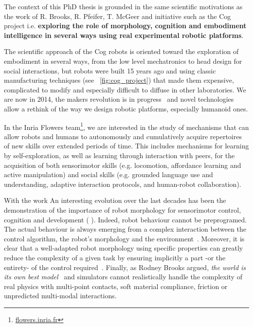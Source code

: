 The context of this PhD thesis is grounded in the same scientific motivations as the work of R. Brooks, R. Pfeifer, T. McGeer and initiative such as the Cog project i.e. \textbf{exploring the role of morphology, cognition and embodiment intelligence in several ways using real experimental robotic platforms}.

The scientific approach of the Cog robots is oriented toward the exploration of embodiment in several ways, from the low level mechatronics to head design for social interactions, but robots were built 15 years ago and using classic manufacturing techniques (see \figurename~\ref{fig:cog_project}) that made them expensive, complicated to modify and especially difficult to diffuse in other laboratories.
We are now in 2014, the makers revolution is in progress~\cite{anderson} and novel technologies allow a rethink of the way we design robotic platforms, especially humanoid ones.


In the Inria Flowers team\footnote{\url{flowers.inria.fr}}, we are interested in the study of mechanisms that can allow robots and humans to autonomously and cumulatively acquire repertoires of new skills over extended periods of time. This includes mechanisms for learning by self-exploration, as well as learning through interaction with peers, for the acquisition of both sensorimotor skills (e.g. locomotion, affordance learning and active manipulation) and social skills (e.g. grounded language use and understanding, adaptive interaction protocols, and human-robot collaboration).

With the work An interesting evolution over the last decades has been the demonstration of the importance of robot morphology for sensorimotor control, cognition and development (\cite{kaplan2008corps} \cite{steels1995artificial} \cite{Pfeifer06}). Indeed, robot behaviour cannot be preprogramed. The actual behaviour is always emerging from a complex interaction between the control algorithm, the robot’s morphology and the environment~\cite{Steels1991emergence}. Moreover, it is clear that a well-adapted robot morphology using specific properties can greatly reduce the complexity of a given task by ensuring implicitly a part -or the entirety- of the control required~\cite{pfeifer2005morphological}.
Finally, as Rodney Brooks argued, \emph{the world is its own best model}~\cite{brooks1991intelligence} and simulators cannot realistically handle the complexity of real physics with multi-point contacts, soft material compliance, friction or unpredicted multi-modal interactions.


